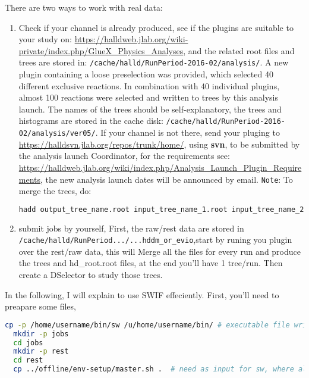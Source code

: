 \documentclass{article}
\begin{document}
There are two ways to work with real data:
\begin{enumerate}
\item Check if your channel is already produced, see if the plugins are suitable to your study on: \url{https://halldweb.jlab.org/wiki-private/index.php/GlueX_Physics_Analyses}, and the related root files and trees are stored in: \texttt{/cache/halld/RunPeriod-2016-02/analysis/}. A new plugin containing a loose preselection was provided, which selected 40 different exclusive reactions. In combination with 40 individual plugins, almost 100 reactions were selected and written to trees by this analysis launch. The names of the trees should be self-explanatory, the trees and histograms are stored in the cache disk: \texttt{/cache/halld/RunPeriod-2016-02/analysis/ver05/}.
\newline If your channel is not there, send your pluging to \url{https://halldsvn.jlab.org/repos/trunk/home/}, using \textbf{svn}, to be submitted by the analysis launch Coordinator, for the requirements see: \url{https://halldweb.jlab.org/wiki/index.php/Analysis_Launch_Plugin_Requirements}, the new analysis launch dates will be announced by email.
  \newline \texttt{Note}: To merge the trees, do:
  \begin{lstlisting}[language=bash]
    hadd output_tree_name.root input_tree_name_1.root input_tree_name_2.root ...
  \end{lstlisting}
\item  submit jobs by yourself, First, the raw/rest data are stored in \texttt{/cache/halld/RunPeriod.../...hddm\_or\_evio},start by runing you plugin over the rest/raw data, this will Merge all the files for every run and produce the trees and hd\_root.root files, at the end you'll have 1 tree/run. Then create a DSelector to study those trees.
\end{enumerate}

In the following, I will explain to use SWIF effeciently.
\newline First, you'll need to preapare some files,
\begin{lstlisting}[language=bash]
  cp -p /home/username/bin/sw /u/home/username/bin/ # executable file written with go language, to submit jobs in good conditions
  mkdir -p jobs
  cd jobs
  mkdir -p rest
  cd rest
  cp ../offline/env-setup/master.sh .  # need as input for sw, where all the environment variables are defined.
\end{lstlisting} 
\end{document}
